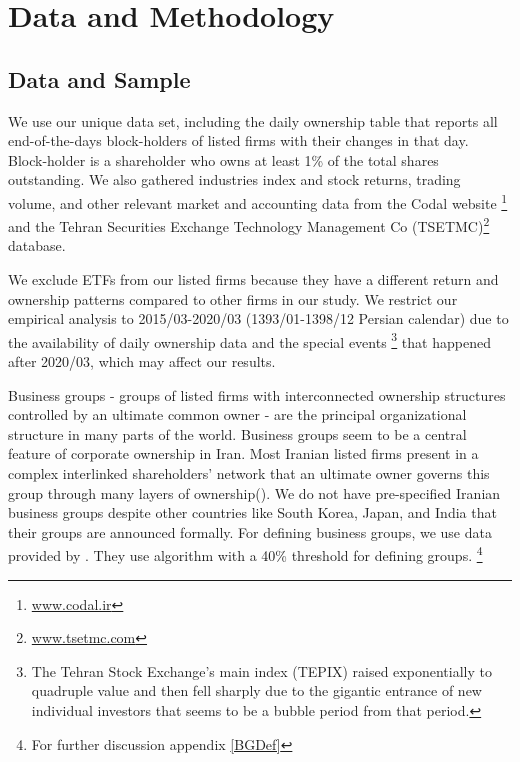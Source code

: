 
\section{{Data and Methodology}}



\subsection{{Data and Sample}}



We  use our unique data set, including the daily ownership table that reports all end-of-the-days block-holders of listed firms with their changes in that day.  Block-holder is a shareholder who owns at least 1\% of the total shares outstanding. 
	We also gathered industries index and stock returns, trading volume, and other relevant market and accounting data from the Codal website \footnote{\href{http://www.codal.ir}{www.codal.ir}}
and the  Tehran Securities Exchange Technology Management Co (TSETMC)\footnote{\href{http://www.tsetmc.com}{www.tsetmc.com}} database.

We exclude ETFs from our listed firms because they have a different return and ownership patterns compared to other firms in our study.
We restrict our empirical analysis to 2015/03-2020/03 (1393/01-1398/12 Persian calendar) due to the availability of daily ownership data and the special events \footnote{
	The Tehran Stock Exchange's main index (TEPIX) raised exponentially to quadruple value and then fell sharply due to the gigantic entrance of new individual investors that seems to be a bubble period from that period.} that happened after 2020/03, which may affect our results. 

Business groups - groups of listed firms with interconnected ownership structures controlled by an ultimate common owner - are the principal organizational structure in many parts of the world.
Business groups seem to be a central feature of corporate ownership in Iran. 
Most Iranian listed firms present in a complex interlinked shareholders' network that an ultimate owner governs this group through many layers of ownership({\cite{Aliabadi2022}}).  
We do not have pre-specified Iranian business groups despite other countries like South Korea, Japan, and India that their groups are announced formally.
For defining business groups, we use data provided by {\cite{Aliabadi2022}}.
They use \cite{almeida2011structure} algorithm with a 40\% threshold for defining groups. \footnote{For further discussion appendix \ref{BGDef}}


